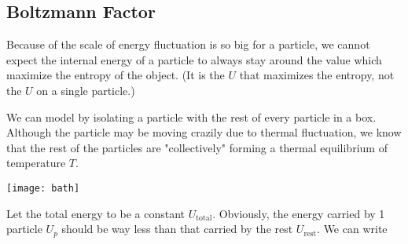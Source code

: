\documentclass[class=article, crop=false, 12pt]{standalone}
\begin{document}
\subsection{Boltzmann Factor}

Because of the scale of energy fluctuation is so big for a particle,
we cannot expect the internal energy of a particle to always stay around the value which maximize the entropy of the object.
(It is the  $U$ that maximizes the entropy, not the $U$ on a single particle.)
\begin{center}
\end{center}

We can model by isolating a particle with the rest of every particle in a box. 
Although the particle may be moving crazily due to thermal fluctuation, 
we know that the rest of the particles are "collectively" forming a thermal equilibrium of temperature $T$.

\begin{center}
    \begin{minipage}{0.25\linewidth}
        \centering
    \end{minipage}
    \green{$\xrightarrow{\phantom{00000}}$}
    \begin{minipage}{0.3\linewidth}
        \centering
        \texttt{[image: bath]}
    \end{minipage}
    \blue{$\xleftarrow{\phantom{00000}}$}
    \begin{minipage}{0.26\linewidth}
        \centering
    \end{minipage}
\end{center}

Let the total energy to be a constant $U_\text{total}$.
Obviously, the energy carried by 1 particle $U_p$ should be way less than that carried by the rest $U_\text{rest}$.
We can write
\end{document}
